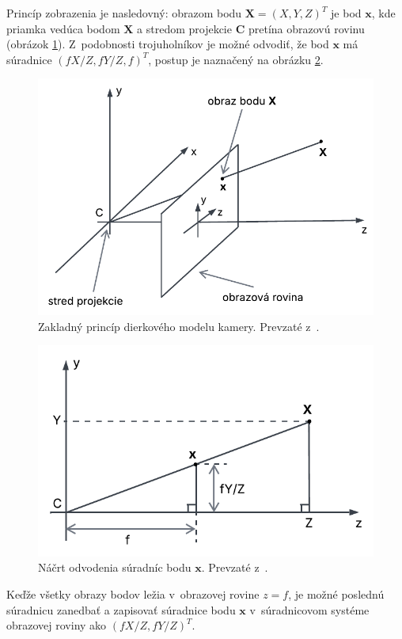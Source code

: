 Princíp zobrazenia je nasledovný: obrazom bodu $\mathbf{X} = (X, Y, Z)^T$ je bod $\mathbf{x}$, kde priamka vedúca bodom $\mathbf{X}$ a stredom projekcie $\mathbf{C}$ pretína obrazovú rovinu (obrázok \ref{fig:model_kamery1}). Z~podobnosti trojuholníkov je možné odvodiť, že bod $\mathbf{x}$ má súradnice $(fX/Z, fY/Z, f)^T$, postup je naznačený na obrázku \ref{fig:model_kamery2}.

\begin{figure}[h!]
    \centering
    \includegraphics[width=0.7\linewidth]{text_prace/obrazky-figures/model_kamery1.pdf}
    \caption[Zakladný princíp dierkového modelu kamery.]{Zakladný princíp dierkového modelu kamery. Prevzaté z~\cite{multiple_view_geometry}.}
    \label{fig:model_kamery1}
\end{figure}

\begin{figure}[h!]
    \centering
    \includegraphics[width=0.7\linewidth]{text_prace/obrazky-figures/model_kamery2.pdf}
    \caption[Náčrt odvodenia súradníc zobrazovaného bodu u~dierkového modelu kamery.]{Náčrt odvodenia súradníc bodu $\mathbf{x}$. Prevzaté z~\cite{multiple_view_geometry}.}
    \label{fig:model_kamery2}
\end{figure}

Keďže všetky obrazy bodov ležia v~obrazovej rovine $z = f$, je možné poslednú súradnicu zanedbať a zapisovať súradnice bodu $\mathbf{x}$ v~súradnicovom systéme obrazovej roviny ako $(fX/Z, fY/Z)^T$.

